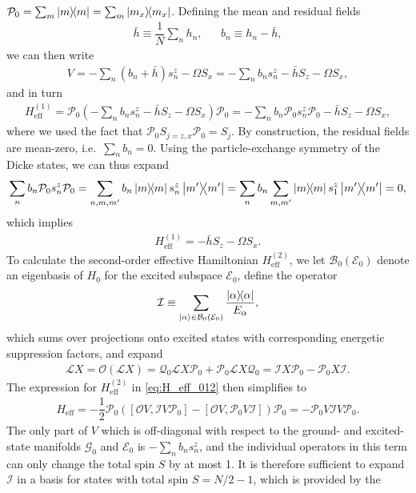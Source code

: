 \documentclass[aps,notitlepage,nofootinbib,11pt]{revtex4-1}
\renewcommand{\t}{\text} %
\newcommand{\f}[2]{\dfrac{#1}{#2}} %
\newcommand{\p}[1]{\left(#1\right)} %
\renewcommand{\sp}[1]{\left[#1\right]} %
\newcommand{\B}{\mathcal{B}}
\newcommand{\E}{\mathcal{E}}
\newcommand{\G}{\mathcal{G}}
\newcommand{\I}{\mathcal{I}}
\renewcommand{\L}{\mathcal{L}}
\renewcommand{\O}{\mathcal{O}}
\renewcommand{\P}{\mathcal{P}}
\newcommand{\Q}{\mathcal{Q}}
\newcommand{\1}{\mathds{1}}
\begin{document}
$\P_0=\sum_m\op{m}=\sum_m\op{m_x}$.  Defining the mean and residual
fields
\begin{align}
  \bar h \equiv \f1N \sum_n h_n,
  &&
  b_n \equiv h_n - \bar h,
\end{align}
we can then write
\begin{align}
  V = -\sum_n \p{b_n+\bar h} s_n^z - \Omega S_x
  = -\sum_n b_n s_n^z - \bar h S_z - \Omega S_x,
\end{align}
and in turn
\begin{align}
  H_{\t{eff}}^{(1)}
  = \P_0\p{-\sum_n b_n s_n^z - \bar h S_z - \Omega S_x} \P_0
  = -\sum_n b_n \P_0 s_n^z\P_0 - \bar h S_z - \Omega S_x,
\end{align}
where we used the fact that $\P_0 S_{j=z,x} \P_0 = S_j$.  By
construction, the residual fields are mean-zero, i.e.~$\sum_nb_n=0$.
Using the particle-exchange symmetry of the Dicke states, we can thus
expand
\begin{align}
  \sum_n b_n \P_0 s_n^z \P_0
  = \sum_{n,m,m'} b_n \op{m} s_n^z \op{m'}
  = \sum_n b_n \sum_{m,m'} \op{m} s_1^z \op{m'}
  = 0,
\end{align}
which implies
\begin{align}
  H_{\t{eff}}^{(1)} = - \bar h S_z - \Omega S_x.
\end{align}
To calculate the second-order effective Hamiltonian
$H_{\t{eff}}^{(2)}$, we let $\B_0\p{\E_0}$ denote an eigenbasis of
$H_0$ for the excited subspace $\E_0$, define the operator
\begin{align}
  \I \equiv \sum_{\ket\alpha\in\B_0\p{\E_0}} \f{\op\alpha}{E_\alpha},
\end{align}
which sums over projections onto excited states with corresponding
energetic suppression factors, and expand
\begin{align}
  \L X = \O\p{\L X}
  = \Q_0 \L X \P_0 + \P_0 \L X \Q_0
  = \I X \P_0 - \P_0 X \I.
\end{align}
The expression for $H_{\t{eff}}^{(2)}$ in \eqref{eq:H_eff_012} then
simplifies to
\begin{align}
  H_{\t{eff}}
  = -\f12 \P_0 \p{\sp{\O V, \I V \P_0} - \sp{\O V, \P_0 V \I}} \P_0
  = -\P_0 V \I V \P_0.
\end{align}
The only part of $V$ which is off-diagonal with respect to the ground-
and excited-state manifolds $\G_0$ and $\E_0$ is $-\sum_nb_ns_n^z$,
and the individual operators in this term can only change the total
spin $S$ by at most 1.  It is therefore sufficient to expand $\I$ in a
basis for states with total spin $S=N/2-1$, which is provided by the
\end{document}
